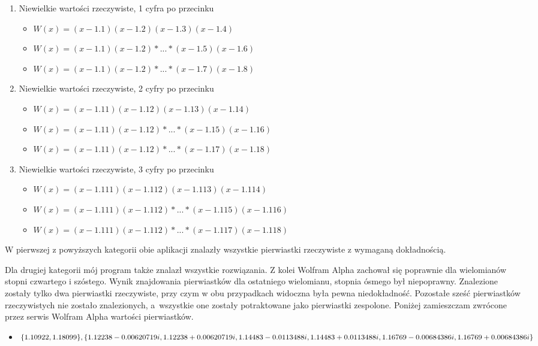 \begin{enumerate}
	\item Niewielkie wartości rzeczywiste, 1 cyfra po przecinku
	\begin{itemize}
		\item $W(x)=(x-1.1)(x-1.2)(x-1.3)(x-1.4)$
		\item $W(x)=(x-1.1)(x-1.2)*...*(x-1.5)(x-1.6)$
		\item $W(x)=(x-1.1)(x-1.2)*...*(x-1.7)(x-1.8)$
	\end{itemize}
	\item Niewielkie wartości rzeczywiste, 2 cyfry po przecinku
	\begin{itemize}
		\item $W(x)=(x-1.11)(x-1.12)(x-1.13)(x-1.14)$
		\item $W(x)=(x-1.11)(x-1.12)*...*(x-1.15)(x-1.16)$
		\item $W(x)=(x-1.11)(x-1.12)*...*(x-1.17)(x-1.18)$
	\end{itemize}
	\item Niewielkie wartości rzeczywiste, 3 cyfry po przecinku
	\begin{itemize}
		\item $W(x)=(x-1.111)(x-1.112)(x-1.113)(x-1.114)$
		\item $W(x)=(x-1.111)(x-1.112)*...*(x-1.115)(x-1.116)$
		\item $W(x)=(x-1.111)(x-1.112)*...*(x-1.117)(x-1.118)$
	\end{itemize}
\end{enumerate}

W pierwszej z powyższych kategorii obie aplikacji znalazły wszystkie pierwiastki rzeczywiste z wymaganą dokładnością.

Dla drugiej kategorii mój program także znalazł wszystkie rozwiązania. Z kolei Wolfram Alpha zachował się poprawnie dla wielomianów stopni czwartego i szóstego. Wynik znajdowania pierwiastków dla ostatniego wielomianu, stopnia ósmego był niepoprawny. Znalezione zostały tylko dwa pierwiastki rzeczywiste, przy czym w obu przypadkach widoczna była pewna niedokładność. Pozostałe sześć pierwiastków rzeczywistych nie zostało znalezionych, a~wszystkie one zostały potraktowane jako pierwiastki zespolone. Poniżej zamieszczam zwrócone przez serwis Wolfram Alpha wartości pierwiastków.

\begin{itemize}
	\item $\{1.10922, 1.18099\}, \{1.12238-0.00620719i, 1.12238+0.00620719i, \\
	1.14483-0.0113488i, 1.14483+0.0113488i, 1.16769-0.00684386 i, 1.16769+0.00684386i\}$
\end{itemize}

